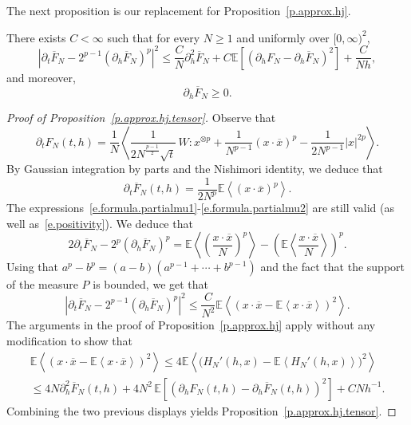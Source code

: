 \documentclass[10pt]{amsart}
\theoremstyle{definition}\newtheorem{defi}[theo]{Definition}\newtheorem{rema}[theo]{Remark}\newtheorem{exam}[theo]{Example}\newtheorem{exem}[theo]{Example}\newtheorem{nota}[theo]{Notation}
\newcommand{\E}{\mathbb{E}}
\newcommand{\1}{\mathds{1}}
\renewcommand{\le}{\leqslant}
\renewcommand{\ge}{\geqslant}
\newcommand{\la}{\left\langle}
\newcommand{\ra}{\right\rangle}
\renewcommand{\bar}{\overline}
\begin{document}
The next proposition is our replacement for Proposition~\ref{p.approx.hj}.


\begin{prop}\label{p.approx.hj.tensor}
There exists $C < \infty$ such that for every $N \ge 1$ and uniformly over $[0,\infty)^2$,
\[
\left|\partial_t \bar F_N - 2^{p-1}\left(\partial_{h} \bar F_N\right)^p\right|^2 \le \frac{C}{N} \partial_{h}^2 \bar F_N + C\E \left[\left(\partial_h F_N - \partial_h \bar F_N\right)^2 \right] +\frac{C}{Nh},
\]
and moreover,
\begin{equation}\label{e.boundary.tensor}
\partial_h \bar F_N\ge 0.
\end{equation}
\end{prop}


\begin{proof}[Proof of Proposition~\ref{p.approx.hj.tensor}]
Observe that
\begin{equation}\label{e.formula.partialt.tensor}
\partial_t F_N(t,{h}) = \frac 1 N\la \frac {1} {2N^{\frac{p-1}{2}}\sqrt {t}} \, W : x^{\otimes p} + \frac 1 {N^{p-1}} (x\cdot \bar x)^p - \frac 1 {2N^{p-1}} |x|^{2p} \ra.
\end{equation}
By Gaussian integration by parts and the Nishimori identity, we deduce that
\[
\partial_t \bar F_N(t,{h}) = \frac 1 {2N^{p}} \E \la (x \cdot \bar x)^p \ra.
\]
The expressions~\eqref{e.formula.partialmu1}-\eqref{e.formula.partialmu2} are still valid (as well as~\eqref{e.positivity}). We deduce that
\begin{equation}\label{e.variance.identity.tensor}
2\partial_t \bar F_N - 2^{p} \left(\partial_{h} \bar F_N\right)^p = \E \la \left(\frac{x \cdot \bar x}{N}\right)^p\ra - \left(\E \la \frac{x \cdot \bar x}{N}\ra \right)^p.
\end{equation}
Using that $a^p - b^p = (a-b)(a^{p-1} + \cdots + b^{p-1})$ and the fact that the support of the measure $P$ is bounded, we get that
\[
\left|\partial_t \bar F_N - 2^{p-1} \left(\partial_{h} \bar F_N\right)^p \right|^2 \le \frac{C}{N^2} \E \la \left(x\cdot \bar x - \E\la x\cdot \bar x \ra \right)^2 \ra.
\]
The arguments in the proof of Proposition~\ref{p.approx.hj} apply without any modification to show that
\begin{multline*}
\E \la \left(x\cdot \bar x - \E\la x\cdot \bar x \ra \right)^2 \ra  \le 4 \E \la \big(H_N'(h,x) - \E \la H_N'(h,x) \ra \big) ^2 \ra \\
\le 4N \partial_h^2 \bar F_N(t,h) + 4N^2 \, \E \left[\left(\partial_h F_N(t,h) - \partial_h \bar F_N(t,h) \right) ^2 \right]+ C N h^{-1}.
\end{multline*}
Combining the two previous displays yields Proposition~\ref{p.approx.hj.tensor}.
\end{proof}
\end{document}

